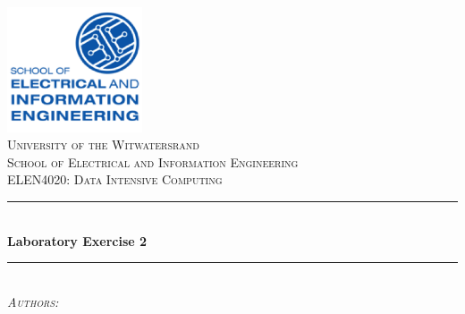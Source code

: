\documentclass[10pt,twocolumn]{witseiepaper}
\begin{document}
	
	\begin{titlepage}
		
		\newcommand{\HRule}{\rule{\linewidth}{0.3mm}} %
		
		\center %
		
		\includegraphics[width=0.3\textwidth]{EIE.png}\\[1cm] %
		
		\textsc{\LARGE University of the Witwatersrand } \\[0.1cm] %
		\textsc{\LARGE School of Electrical and Information Engineering }\\[1cm] %
		\textsc{\Large ELEN4020: Data Intensive Computing}\\[1.5cm] %
		
		
		\HRule \\[0.4cm]
		{ \huge \bfseries Laboratory Exercise 2} \\[0.4cm] %
		\HRule \\[1.5cm]
		
		\textsc{\Large 	\emph{Authors:} } \\[0.1cm]	 
		

\end{titlepage}
\end{document}
